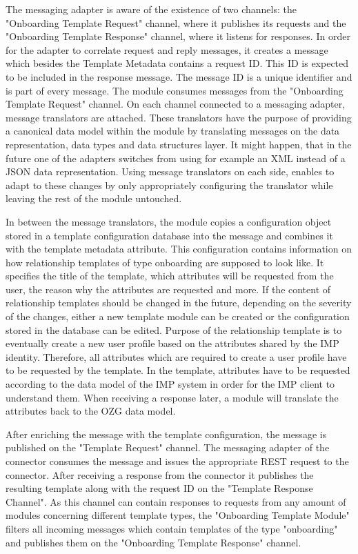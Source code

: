 The messaging adapter is aware of the existence of two channels: the "Onboarding Template Request" channel, where it publishes its requests and the "Onboarding Template Response" channel, where it listens for responses. In order for the adapter to correlate request and reply messages, it creates a message which besides the Template Metadata contains a request ID. This ID is expected to be included in the response message. The message ID is a unique identifier and is part of every message. The module consumes messages from the "Onboarding Template Request" channel. On each channel connected to a messaging adapter, message translators are attached. These translators have the purpose of providing a canonical data model within the module by translating messages on the data representation, data types and data structures layer. It might happen, that in the future one of the adapters switches from using for example an XML instead of a JSON data representation. Using message translators on each side, enables to adapt to these changes by only appropriately configuring the translator while leaving the rest of the module untouched.

In between the message translators, the module copies a configuration object stored in a template configuration database into the message and combines it with the template metadata attribute. This configuration contains information on how relationship templates of type onboarding are supposed to look like. It specifies the title of the template, which attributes will be requested from the user, the reason why the attributes are requested and more. If the content of relationship templates should be changed in the future, depending on the severity of the changes, either a new template module can be created or the configuration stored in the database can be edited. Purpose of the relationship template is to eventually create a new user profile based on the attributes shared by the IMP identity. Therefore, all attributes which are required to create a user profile have to be requested by the template. In the template, attributes have to be requested according to the data model of the IMP system in order for the IMP client to understand them. When receiving a response later, a module will translate the attributes back to the OZG data model.


After enriching the message with the template configuration, the message is published on the "Template Request" channel. The messaging adapter of the connector consumes the message and issues the appropriate REST request to the connector. After receiving a response from the connector it publishes the resulting template along with the request ID on the "Template Response Channel". As this channel can contain responses to requests from any amount of modules concerning different template types, the "Onboarding Template Module" filters all incoming messages which contain templates of the type "onboarding" and publishes them on the "Onboarding Template Response" channel.

